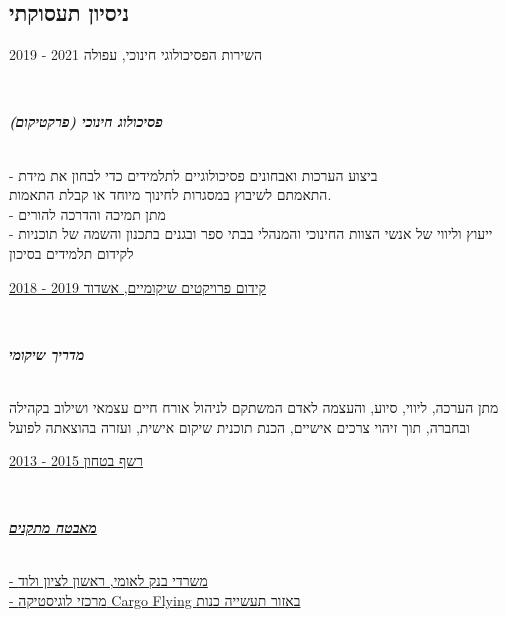 \documentclass[
	11pt,a4paper %
]{article}
\newcommand{\jobentry}[5]{
	{\raggedleft\textsc{#1\expandafter\ifstrequal\expandafter{#2}{}{}{\hspace{6pt}\footnotesize{(#2)}}}\par} %
	\expandafter\ifstrequal\expandafter{#3}{}{}{{\raggedright\large #3}\\} %
	\expandafter\ifstrequal\expandafter{#4}{}{}{{\raggedright\large\textit{\textbf{#4}}}\\[4pt]} %
	\expandafter\ifstrequal\expandafter{#5}{}{}{#5} %
	\medskip %
}
\begin{document}
\begin{hebrew}
\begin{paracol}{2}
\section{ניסיון תעסוקתי}





\jobentry
{} %
{} %
{השירות הפסיכולוגי חינוכי, עפולה \hfill 2021 - 2019} %
{פסיכולוג חינוכי (פרקטיקום)} %
{- ביצוע הערכות ואבחונים פסיכולוגיים לתלמידים כדי לבחון את מידת \\
התאמתם לשיבוץ במסגרות לחינוך מיוחד או קבלת התאמות. \\
- מתן תמיכה והדרכה להורים \\
- ייעוץ וליווי של אנשי הצוות החינוכי והמנהלי בבתי ספר ובגנים בתכנון והשמה של תוכניות לקידום תלמידים בסיכון
} %

\hrulefill

\jobentry
{} %
{} %
{\href{http://www.kidumpro.co.il/}{קידום פרויקטים שיקומיים, אשדוד \hfill 2019 - 2018}} %
{מדריך שיקומי} %
{
מתן הערכה, ליווי, סיוע, והעצמה לאדם המשתקם לניהול אורח חיים עצמאי ושילוב בקהילה ובחברה, תוך זיהוי צרכים אישיים, הכנת תוכנית שיקום אישית, ועזרה בהוצאתה לפועל
} %

\hrulefill

\jobentry
{} %
{} %
{\href{https://loona-il.000webhostapp.com/resume-references/recommendation-letter-security-guard.jpg}{רשף בטחון \hfill 2015 - 2013}} %
{\href{https://loona-il.000webhostapp.com/resume-references/recommendation-letter-security-guard.jpg}{מאבטח מתקנים}} %
{\href{https://loona-il.000webhostapp.com/resume-references/recommendation-letter-security-guard.jpg}{- משרדי בנק לאומי, ראשון לציון ולוד\\
		- מרכזי לוגיסטיקה Cargo Flying באזור תעשייה כנות
}}


\end{paracol}
\end{hebrew}
\end{document}
